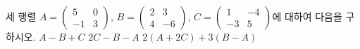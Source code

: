 세 행렬 $A=\begin{pmatrix} 5 & 0 \\ -1 & 3 \end{pmatrix}$, $B=\begin{pmatrix} 2 & 3 \\ 4 & -6 \end{pmatrix}$, $C=\begin{pmatrix} 1 & -4 \\ -3 & 5 \end{pmatrix}$에 대하여 다음을 구하시오.
 $A-B+C$
 $2C-B-A$
 $2(A+2C)+3(B-A)$
